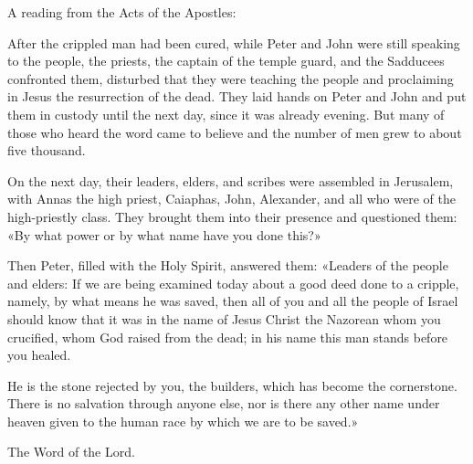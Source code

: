 \indent A reading from the Acts of the Apostles:

After the crippled man had been cured, while Peter and John were still speaking to the people, the priests, the captain of the temple guard, and the Sadducees confronted them, disturbed that they were teaching the people and proclaiming in Jesus the resurrection of the dead. They laid hands on Peter and John and put them in custody until the next day, since it was already evening. But many of those who heard the word came to believe and the number of men grew to about five thousand.

On the next day, their leaders, elders, and scribes were assembled in Jerusalem, with Annas the high priest, Caiaphas, John, Alexander, and all who were of the high-priestly class. They brought them into their presence and questioned them: «By what power or by what name have you done this?»

Then Peter, filled with the Holy Spirit, answered them: «Leaders of the people and elders: If we are being examined today about a good deed done to a cripple, namely, by what means he was saved, then all of you and all the people of Israel should know that it was in the name of Jesus Christ the Nazorean whom you crucified, whom God raised from the dead; in his name this man stands before you healed.

He is the stone rejected by you, the builders, which has become the cornerstone. There is no salvation through anyone else, nor is there any other name under heaven given to the human race by which we are to be saved.»

The Word of the Lord.

